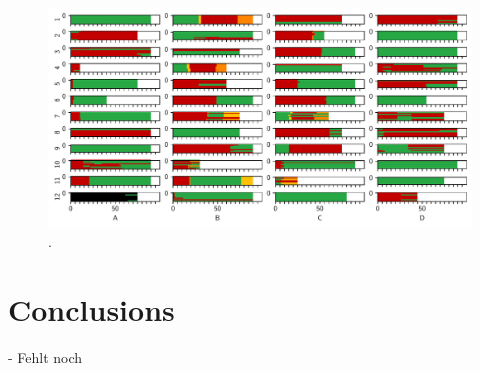 \begin{figure}[t]
    \centering
    \includegraphics[width=\linewidth]{images/predictability-real-examples.pdf}
    \caption{.}\label{fig:predictability-real-examples}
\end{figure}



\section{Conclusions}

- Fehlt noch
